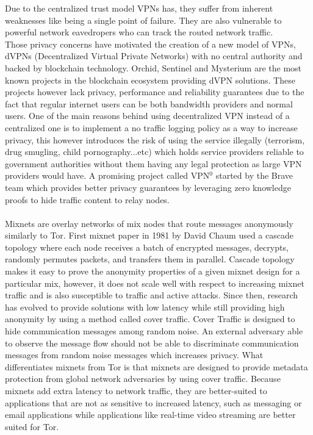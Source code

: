 Due to the centralized trust model VPNs has, they suffer from inherent weaknesses like being a single point of failure. They are also vulnerable to powerful network eavedropers who can track the routed network traffic.
\\Those privacy concerns have motivated the creation of a new model of VPNs, dVPNs (Decentralized Virtual Private Networks) with no central authority and backed by blockchain technology. Orchid, Sentinel and Mysterium are the most known projects in the blockchain ecosystem providing dVPN solutions. These projects however lack privacy, performance and reliability guarantees due to the fact that regular internet users can be both bandwidth providers and normal users. One of the main reasons behind using decentralized VPN instead of a centralized one is to implement a no traffic logging policy as a way to increase privacy, this however introduces the risk of using the service illegally (terrorism, drug smugling, child pornography...etc) which holds service providers reliable to government authorities without them having any legal protection as large VPN providers would have. A promising project called VPN$^0$ started by the Brave team which provides better privacy guarantees by leveraging zero knowledge proofs to hide traffic content to relay nodes. 
\\~\\Mixnets are overlay networks of mix nodes that route messages anonymously similarly to Tor. First mixnet paper in 1981 by David Chaum used a cascade topology where each node receives a batch of encrypted messages, decrypts, randomly permutes packets, and transfers them in parallel. Cascade topology makes it easy to prove the anonymity properties of a given mixnet design for a particular mix, however, it does not scale well with respect to increasing mixnet traffic and is also susceptible to traffic and active attacks. Since then, research has evolved to provide solutions with low latency while still providing high anonymity by using a method called cover traffic. Cover Traffic is designed to hide communication messages among random noise. An external adversary able to observe the message flow should not be able to discriminate communication messages from random noise messages which increases privacy. 
What differentiates mixnets from Tor is that mixnets are designed to provide metadata protection from global network adversaries by using cover traffic. Because mixnets add extra latency to network traffic, they are better-suited to applications that are not as sensitive to increased latency, such as messaging or email applications while applications like real-time video streaming are better suited for Tor.
